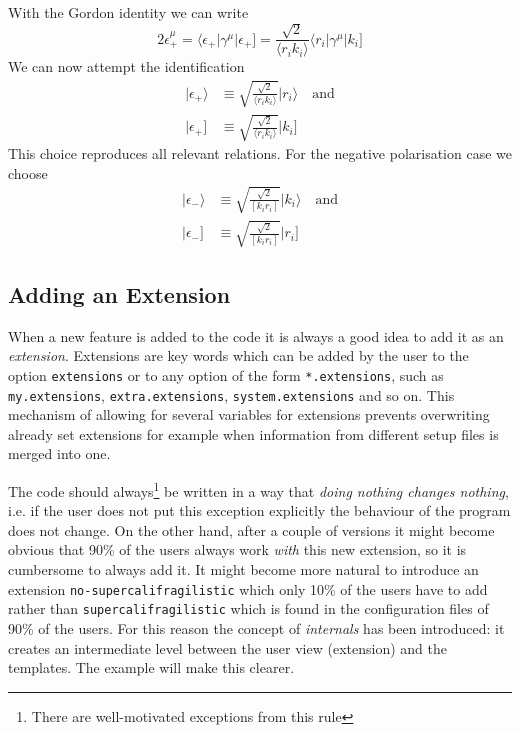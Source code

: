 \documentclass[11pt,a4paper]{refrep}
\begin{document}
With the Gordon identity we can write
\begin{equation}
2\epsilon_+^\mu=\langle\epsilon_+\vert\gamma^\mu\vert\epsilon_+]
=\frac{\sqrt{2}}{\langle r_ik_i\rangle}\langle r_i\vert\gamma^\mu\vert k_i]
\end{equation}
We can now attempt the identification
\begin{align}
\vert\epsilon_+\rangle &\equiv\sqrt{\frac{\sqrt{2}}{\langle r_ik_i\rangle}}
   \vert r_i\rangle
\quad\text{and}\\
\vert\epsilon_+] &\equiv\sqrt{\frac{\sqrt{2}}{\langle r_ik_i\rangle}}
   \vert k_i]
\end{align}
This choice reproduces all relevant relations. For the negative polarisation
case we choose
\begin{align}
\vert\epsilon_-\rangle &\equiv\sqrt{\frac{\sqrt{2}}{[k_ir_i]}}
   \vert k_i\rangle
\quad\text{and}\\
\vert\epsilon_-] &\equiv\sqrt{\frac{\sqrt{2}}{[k_ir_i]}}
   \vert r_i]
\end{align}

\subsection{Adding an Extension}
When a new feature is added to the code it is always a good idea to add it
as an \emph{extension}. Extensions are key words which can be added by
the user to the option \texttt{extensions} or to any option of the
form \texttt{*.extensions}, such as \texttt{my.extensions},
\texttt{extra.extensions}, \texttt{system.extensions} and so on.
This mechanism of allowing for
several variables for extensions prevents overwriting already set extensions
for example when information from different setup files is merged into one.

The code should always\footnote{There are well-motivated exceptions from
this rule} be written in a way that \emph{doing nothing changes nothing},
i.e. if the user does not put this exception explicitly the behaviour of
the program does not change. On the other hand, after a couple of versions
it might become obvious that 90\% of the users always work \emph{with}
this new extension, so it is cumbersome to always add it. It might become
more natural to introduce an extension \texttt{no-supercalifragilistic}
which only 10\% of the users have to add
rather than \texttt{supercalifragilistic} which is found in the configuration
files of 90\% of the users. For this reason the concept
of \emph{internals} has been introduced: it creates an intermediate level
between the user view (extension) and the templates. The example will
make this clearer.
\end{document}
